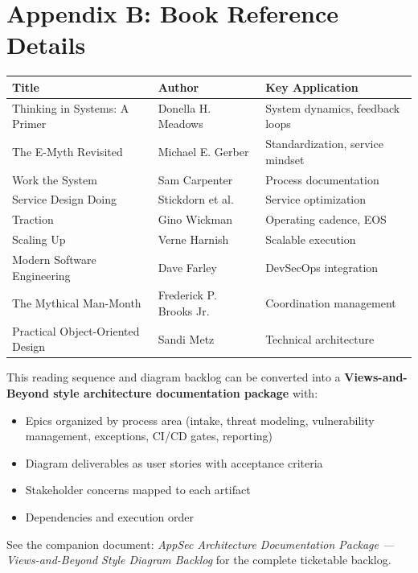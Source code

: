 \documentclass[11pt,letterpaper]{article}
\begin{document}
\newpage

\section*{Appendix B: Book Reference Details}

\begin{center}
\renewcommand{\arraystretch}{1.4}
\begin{tabular}{p{5cm}p{3.5cm}p{4.5cm}}
\toprule
\textbf{Title} & \textbf{Author} & \textbf{Key Application} \\
\midrule
Thinking in Systems: A Primer & Donella H. Meadows & System dynamics, feedback loops \\
The E-Myth Revisited & Michael E. Gerber & Standardization, service mindset \\
Work the System & Sam Carpenter & Process documentation \\
Service Design Doing & Stickdorn et al. & Service optimization \\
Traction & Gino Wickman & Operating cadence, EOS \\
Scaling Up & Verne Harnish & Scalable execution \\
Modern Software Engineering & Dave Farley & DevSecOps integration \\
The Mythical Man-Month & Frederick P. Brooks Jr. & Coordination management \\
Practical Object-Oriented Design & Sandi Metz & Technical architecture \\
\bottomrule
\end{tabular}
\end{center}

\vspace{2cm}

\begin{highlightbox}
This reading sequence and diagram backlog can be converted into a \textbf{Views-and-Beyond style architecture documentation package} with:
\begin{itemize}[nosep]
    \item Epics organized by process area (intake, threat modeling, vulnerability management, exceptions, CI/CD gates, reporting)
    \item Diagram deliverables as user stories with acceptance criteria
    \item Stakeholder concerns mapped to each artifact
    \item Dependencies and execution order
\end{itemize}

See the companion document: \textit{AppSec Architecture Documentation Package --- Views-and-Beyond Style Diagram Backlog} for the complete ticketable backlog.
\end{highlightbox}
\end{document}
